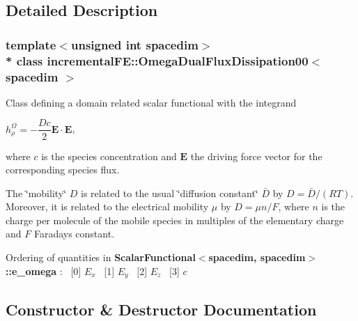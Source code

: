 \subsection{Detailed Description}
\subsubsection*{template$<$unsigned int spacedim$>$\\*
class incremental\+F\+E\+::\+Omega\+Dual\+Flux\+Dissipation00$<$ spacedim $>$}

Class defining a domain related scalar functional with the integrand

$ h^\Omega_\rho = -\dfrac{D c}{2} \boldsymbol{E} \cdot \boldsymbol{E} $,

where $c$ is the species concentration and $\boldsymbol{E}$ the driving force vector for the corresponding species flux.

The \char`\"{}mobility\char`\"{} $D$ is related to the usual \char`\"{}diffusion constant\char`\"{} $ \bar D $ by $D = \bar D/(RT)$. Moreover, it is related to the electrical mobility $\mu$ by $ D = \mu n/F$, where $n$ is the charge per molecule of the mobile species in multiples of the elementary charge and $F$ Faraday\textquotesingle{}s constant.

Ordering of quantities in {\bf Scalar\+Functional$<$spacedim, spacedim$>$\+::e\+\_\+omega} \+:~\newline
\mbox{[}0\mbox{]} $E_x$~\newline
 \mbox{[}1\mbox{]} $E_y$~\newline
 \mbox{[}2\mbox{]} $E_z$~\newline
 \mbox{[}3\mbox{]} $c$ 

\subsection{Constructor \& Destructor Documentation}
